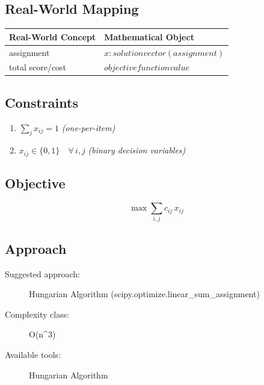 \documentclass[11pt, a4paper]{article}
\begin{document}
\subsection{Real-World Mapping}

\begin{longtable}{ll}
\toprule
\textbf{Real-World Concept} & \textbf{Mathematical Object} \\
\midrule
\endhead
assignment & $x: solution vector (assignment)$ \\
total score/cost & $objective function value$ \\
\bottomrule
\end{longtable}

\subsection{Constraints}

\begin{enumerate}
  \item $\sum_j x_{{ij}} = 1$
  \hfill \textit{(one-per-item)}
  \item $x_{ij} \in \{0, 1\} \quad \forall\, i, j$
  \hfill \textit{(binary decision variables)}
\end{enumerate}

\subsection{Objective}

\begin{equation}
\max \sum_{i,j} c_{ij} \, x_{ij}
\end{equation}

\subsection{Approach}

\begin{description}
  \item[Suggested approach:] Hungarian Algorithm (scipy.optimize.linear\_sum\_assignment)
  \item[Complexity class:] O(n\textasciicircum{}3)
  \item[Available tools:] Hungarian Algorithm
\end{description}
\end{document}
